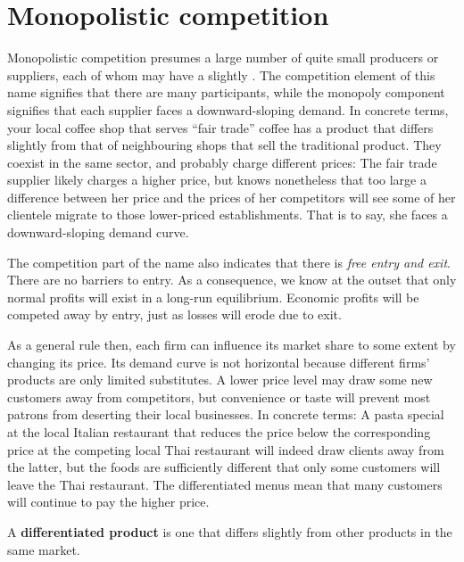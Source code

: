\section{Monopolistic competition}\label{sec:ch11sec3}

Monopolistic competition presumes a large number of quite small producers or
suppliers, each of whom may have a slightly . The competition element of this name signifies that there are many
participants, while the monopoly component signifies that each supplier
faces a downward-sloping demand. In concrete terms, your local coffee shop
that serves ``fair trade'' coffee has a product that differs slightly from
that of neighbouring shops that sell the traditional product. They coexist
in the same sector, and probably charge different prices: The fair trade
supplier likely charges a higher price, but knows nonetheless that too large
a difference between her price and the prices of her competitors will see
some of her clientele migrate to those lower-priced establishments. That is
to say, she faces a downward-sloping demand curve.

The competition part of the name also indicates that there is \textit{free
	entry and exit}. There are no barriers to entry. As a consequence, we know
at the outset that only normal profits will exist in a long-run equilibrium.
Economic profits will be competed away by entry, just as losses will erode
due to exit.

As a general rule then, each firm can influence its market share to some
extent by changing its price. Its demand curve is not horizontal because
different firms' products are only limited substitutes. A lower price level
may draw some new customers away from competitors, but convenience or taste
will prevent most patrons from deserting their local businesses. In concrete
terms: A pasta special at the local Italian restaurant that reduces the
price below the corresponding price at the competing local Thai restaurant
will indeed draw clients away from the latter, but the foods are
sufficiently different that only some customers will leave the Thai
restaurant. The differentiated menus mean that many customers will continue
to pay the higher price.

\begin{DefBox}
	A \textbf{differentiated product} is one that differs slightly from other products in the same market.
\end{DefBox}

